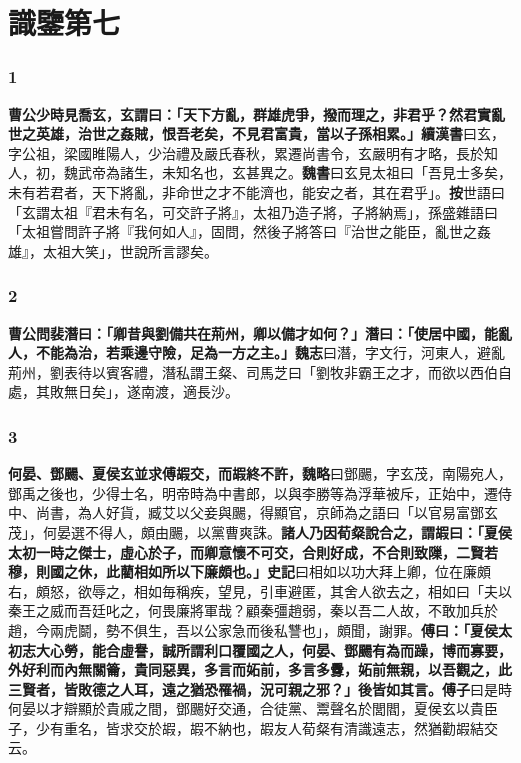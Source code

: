 \chapter{識鑒第七}

\subsection*{1}

\textbf{曹公少時見喬玄，玄謂曰：「天下方亂，群雄虎爭，撥而理之，非君乎？然君實亂世之英雄，治世之姦賊，恨吾老矣，不見君富貴，當以子孫相累。」}{\footnotesize \textbf{續漢書}曰玄，字公祖，梁國睢陽人，少治禮及嚴氏春秋，累遷尚書令，玄嚴明有才略，長於知人，初，魏武帝為諸生，未知名也，玄甚異之。\textbf{魏書}曰玄見太祖曰「吾見士多矣，未有若君者，天下將亂，非命世之才不能濟也，能安之者，其在君乎」。\textbf{按}世語曰「玄謂太祖『君未有名，可交許子將』，太祖乃造子將，子將納焉」，孫盛雜語曰「太祖嘗問許子將『我何如人』，固問，然後子將答曰『治世之能臣，亂世之姦雄』，太祖大笑」，世說所言謬矣。}

\subsection*{2}

\textbf{曹公問裴潛曰：「卿昔與劉備共在荊州，卿以備才如何？」潛曰：「使居中國，能亂人，不能為治，若乘邊守險，足為一方之主。」}{\footnotesize \textbf{魏志}曰潛，字文行，河東人，避亂荊州，劉表待以賓客禮，潛私謂王粲、司馬芝曰「劉牧非霸王之才，而欲以西伯自處，其敗無日矣」，遂南渡，適長沙。}

\subsection*{3}

\textbf{何晏、鄧颺、夏侯玄並求傅嘏交，而嘏終不許，}{\footnotesize \textbf{魏略}曰鄧颺，字玄茂，南陽宛人，鄧禹之後也，少得士名，明帝時為中書郎，以與李勝等為浮華被斥，正始中，遷侍中、尚書，為人好貨，臧艾以父妾與颺，得顯官，京師為之語曰「以官易富鄧玄茂」，何晏選不得人，頗由颺，以黨曹爽誅。}\textbf{諸人乃因荀粲說合之，謂嘏曰：「夏侯太初一時之傑士，虛心於子，而卿意懷不可交，合則好成，不合則致隟，二賢若穆，則國之休，此藺相如所以下廉頗也。」}{\footnotesize \textbf{史記}曰相如以功大拜上卿，位在廉頗右，頗怒，欲辱之，相如毎稱疾，望見，引車避匿，其舍人欲去之，相如曰「夫以秦王之威而吾廷叱之，何畏廉將軍哉？顧秦彊趙弱，秦以吾二人故，不敢加兵於趙，今兩虎鬬，勢不俱生，吾以公家急而後私讐也」，頗聞，謝罪。}\textbf{傅曰：「夏侯太初志大心勞，能合虛譽，誠所謂利口覆國之人，何晏、鄧颺有為而躁，博而寡要，外好利而內無關籥，貴同惡異，多言而妬前，多言多釁，妬前無親，以吾觀之，此三賢者，皆敗德之人耳，遠之猶恐罹禍，況可親之邪？」後皆如其言。}{\footnotesize \textbf{傅子}曰是時何晏以才辯顯於貴戚之間，鄧颺好交通，合徒黨、鬻聲名於閭閻，夏侯玄以貴臣子，少有重名，皆求交於嘏，嘏不納也，嘏友人荀粲有清識遠志，然猶勸嘏結交云。}

